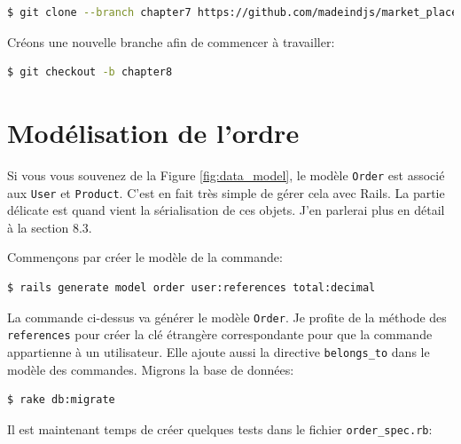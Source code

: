 \documentclass[]{report}
\begin{document}
  \begin{scriptsize}
    \begin{lstlisting}[language=bash]
    $ git clone --branch chapter7 https://github.com/madeindjs/market_place_api
    \end{lstlisting}
  \end{scriptsize}

  Créons une nouvelle branche afin de commencer à travailler:

  \begin{scriptsize}
    \begin{lstlisting}[language=bash]
    $ git checkout -b chapter8
    \end{lstlisting}
  \end{scriptsize}

  \section{Modélisation de l'ordre}

    Si vous vous souvenez de la Figure \ref{fig:data_model}, le modèle \verb|Order| est associé aux \verb|User| et \verb|Product|. C'est en fait très simple de gérer cela avec Rails. La partie délicate est quand vient la sérialisation de ces objets. J'en parlerai plus en détail à la section 8.3.

    Commençons par créer le modèle de la commande:

    \begin{scriptsize}
      \begin{lstlisting}[language=bash]
      $ rails generate model order user:references total:decimal
      \end{lstlisting}
    \end{scriptsize}

    La commande ci-dessus va générer le modèle \verb|Order|. Je profite de la méthode des \verb|references| pour créer la clé étrangère correspondante pour que la commande appartienne à un utilisateur. Elle ajoute aussi la directive \verb|belongs_to| dans le modèle des commandes. Migrons la base de données:

    \begin{scriptsize}
      \begin{lstlisting}[language=bash]
      $ rake db:migrate
      \end{lstlisting}
    \end{scriptsize}

    Il est maintenant temps de créer quelques tests dans le fichier \verb|order_spec.rb|:
\end{document}
